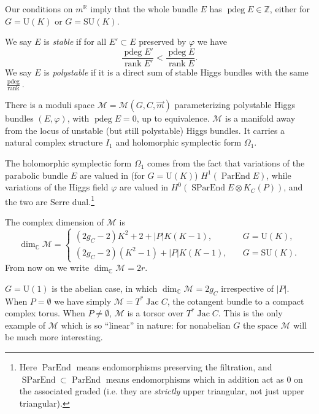 \documentclass[12pt,letterpaper,reqno]{article}
\numberwithin{equation}{section}
\newcommand{\cM}{\ensuremath{\mathcal M}}
\newcommand{\R}{\ensuremath{\mathbb R}}
\newcommand{\C}{\ensuremath{\mathbb C}}
\newcommand{\Z}{\ensuremath{\mathbb Z}}
\newcommand{\abs}[1]{\lvert#1\rvert}
\newcommand{\ti}[1]{\textit{#1}}
\DeclareMathOperator{\ParEnd}{ParEnd}
\DeclareMathOperator{\SParEnd}{SParEnd}
\DeclareMathOperator{\rank}{rank}
\DeclareMathOperator{\Jac}{Jac}
\DeclareMathOperator{\pdeg}{pdeg}
\newcommand{\SU}{\mathrm{SU}}
\newcommand{\U}{\mathrm{U}}
\begin{document}
\begin{remark}[Integrality of $\pdeg E$] Our conditions on $m^\R$ imply that the whole bundle $E$ has $\pdeg E \in \Z$,
either for $G = \U(K)$ or $G = \SU(K)$.
\end{remark}

\begin{defn}
We say $E$ is \ti{stable} if for all $E' \subset E$ preserved
by $\varphi$ we have
\begin{equation}
  \frac{\pdeg E'}{\rank E'} < \frac{\pdeg E}{\rank E}.
\end{equation}
We say $E$ is \ti{polystable} if it is a direct sum of
stable Higgs bundles with the same $\frac{\pdeg}{\rank}$.
\end{defn}

\begin{prop}
There is a moduli space $\cM = \cM(G,C,\vec{m})$ parameterizing
polystable Higgs bundles $(E,\varphi)$, with $\pdeg E = 0$, 
up to equivalence. 
$\cM$ is a manifold away
from the locus of unstable (but still polystable) Higgs bundles.
It carries a natural complex structure $I_1$ and holomorphic symplectic form $\Omega_1$.
\end{prop}

The holomorphic symplectic form 
$\Omega_1$ comes from the fact that variations of the
parabolic bundle $E$ are valued in (for $G = \U(K)$)
$H^1(\ParEnd E)$,
while variations of the Higgs field $\varphi$ are
valued in $H^0(\SParEnd E \otimes K_C(P))$,
and the two are Serre dual.\footnote{Here $\ParEnd$ means
endomorphisms preserving the filtration, and $\SParEnd \subset \ParEnd$ means
endomorphisms which in addition act as $0$
on the associated graded (i.e. they are \ti{strictly} 
upper triangular, not just upper triangular).}

\begin{remark}[Dimension of $\cM$]
The complex dimension of $\cM$ is
\begin{equation} \label{eq:dim-M}
  \dim_\C \cM = \begin{cases} (2g_C-2) K^2 + 2 + \abs{P} K(K-1), & \quad G = \U(K), \\ (2g_C-2) (K^2-1) + \abs{P} K(K-1), & \quad G = \SU(K). \end{cases}
\end{equation}
From now on we write $\dim_\C \cM = 2r$.
\end{remark}

\begin{example}
$G = \U(1)$ is the abelian case, in which $\dim_\C \cM = 2g_C$ irrespective
of $\abs{P}$. When $P = \emptyset$ we have simply $\cM = T^* \Jac C$, the cotangent
bundle to a compact complex torus. When $P \neq \emptyset$, $\cM$ is a torsor
over $T^* \Jac C$.
This is the only example of $\cM$ which is so ``linear'' in nature:
for nonabelian $G$ the space $\cM$ will be much more interesting.
\end{example}
\end{document}
